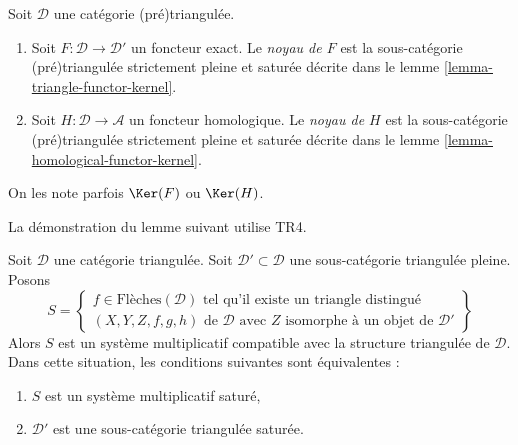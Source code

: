 \begin{definition}
\label{definition-kernel-category}
Soit $\mathcal{D}$ une catégorie (pré)triangulée.
\begin{enumerate}
\item Soit $F : \mathcal{D} \to \mathcal{D}'$ un foncteur exact.
Le {\it noyau de $F$} est la sous-catégorie (pré)triangulée strictement pleine
et saturée décrite dans le lemme \ref{lemma-triangle-functor-kernel}.
\item Soit $H : \mathcal{D} \to \mathcal{A}$ un foncteur homologique.
Le {\it noyau de $H$} est la sous-catégorie (pré)triangulée strictement pleine
et saturée décrite dans le lemme \ref{lemma-homological-functor-kernel}.
\end{enumerate}
On les note parfois $\Ker(F)$ ou $\Ker(H)$.
\end{definition}

\noindent
La démonstration du lemme suivant utilise TR4.

\begin{lemma}
\label{lemma-construct-multiplicative-system}
Soit $\mathcal{D}$ une catégorie triangulée.
Soit $\mathcal{D}' \subset \mathcal{D}$ une sous-catégorie triangulée pleine.
Posons
\begin{equation}
\label{equation-multiplicative-system}
S =
\left\{
\begin{matrix}
f \in \text{Flèches}(\mathcal{D})
\text{ tel qu'il existe un triangle distingué }\\
(X, Y, Z, f, g, h) \text{ de }\mathcal{D}\text{ avec }
Z\text{ isomorphe à un objet de }\mathcal{D}'
\end{matrix}
\right\}
\end{equation}
Alors $S$ est un système multiplicatif compatible avec la structure triangulée
de $\mathcal{D}$. Dans cette situation, les conditions suivantes sont
équivalentes :
\begin{enumerate}
\item $S$ est un système multiplicatif saturé,
\item $\mathcal{D}'$ est une sous-catégorie triangulée saturée.
\end{enumerate}
\end{lemma}

